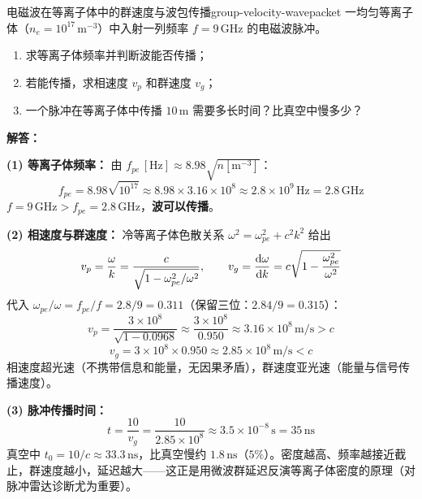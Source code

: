 \begin{example}{电磁波在等离子体中的群速度与波包传播}{group-velocity-wavepacket}
一均匀等离子体（$n_e = 10^{17}\,\mathrm{m^{-3}}$）中入射一列频率 $f = 9\,\mathrm{GHz}$ 的电磁波脉冲。
\begin{enumerate}[label=(\arabic*)]
\item 求等离子体频率并判断波能否传播；
\item 若能传播，求相速度 $v_p$ 和群速度 $v_g$；
\item 一个脉冲在等离子体中传播 $10\,\mathrm{m}$ 需要多长时间？比真空中慢多少？
\end{enumerate}
\tcblower
\textbf{解答：}

\textbf{(1) 等离子体频率：} 由 $f_{pe}\,[\mathrm{Hz}] \approx 8.98\sqrt{n[\mathrm{m^{-3}}]}$：
\[
f_{pe} = 8.98\sqrt{10^{17}} \approx 8.98\times3.16\times10^8 \approx 2.8\times10^9\,\mathrm{Hz} = 2.8\,\mathrm{GHz}
\]
$f = 9\,\mathrm{GHz} > f_{pe} = 2.8\,\mathrm{GHz}$，\textbf{波可以传播}。

\textbf{(2) 相速度与群速度：} 冷等离子体色散关系 $\omega^2 = \omega_{pe}^2 + c^2k^2$ 给出
\[
v_p = \frac{\omega}{k} = \frac{c}{\sqrt{1-\omega_{pe}^2/\omega^2}}, \qquad v_g = \frac{\mathrm{d}\omega}{\mathrm{d} k} = c\sqrt{1-\frac{\omega_{pe}^2}{\omega^2}}
\]
代入 $\omega_{pe}/\omega = f_{pe}/f = 2.8/9 = 0.311$（保留三位：$2.84/9 = 0.315$）：
\[
v_p = \frac{3\times10^8}{\sqrt{1-0.0968}} \approx \frac{3\times10^8}{0.950} \approx 3.16\times10^8\,\mathrm{m/s} > c
\]
\[
v_g = 3\times10^8\times0.950 \approx 2.85\times10^8\,\mathrm{m/s} < c
\]
相速度超光速（不携带信息和能量，无因果矛盾），群速度亚光速（能量与信号传播速度）。

\textbf{(3) 脉冲传播时间：}
\[
t = \frac{10}{v_g} = \frac{10}{2.85\times10^8} \approx 3.5\times10^{-8}\,\mathrm{s} = 35\,\mathrm{ns}
\]
真空中 $t_0 = 10/c \approx 33.3\,\mathrm{ns}$，比真空慢约 $1.8\,\mathrm{ns}$（$5\%$）。密度越高、频率越接近截止，群速度越小，延迟越大——这正是用微波群延迟反演等离子体密度的原理（对脉冲雷达诊断尤为重要）。
\end{example}

